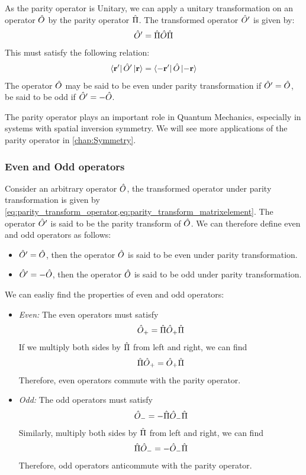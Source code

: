 As the parity operator is Unitary, we can apply a unitary transformation on an operator $\hat{O}$ by the parity operator $\hat{\Pi}$. The transformed operator $\hat{O}'$ is given by:
\begin{align}
    \hat{O}' = \hat{\Pi} \hat{O} \hat{\Pi} \label{eq:parity_transform_operator}
\end{align}
This must satisfy the following relation:
\begin{align}
    \bra{\mathbf{r'}} \hat{O}' \ket{\mathbf{r}} = \bra{-\mathbf{r'}} \hat{O} \ket{-\mathbf{r}} \label{eq:parity_transform_matrixelement}
\end{align}
The operator $\hat{O}$ may be said to be even under parity transformation if $\hat{O}' = \hat{O}$, be said to be odd if $\hat{O}'=-\hat{O}$.

The parity operator plays an important role in Quantum Mechanics, especially in systems with spatial inversion symmetry. We will see more applications of the parity operator in \cref{chap:Symmetry}.

\subsubsection{Even and Odd operators}
Consider an arbitrary operator $\hat{O}$, the transformed operator under parity transformation is given by \cref{eq:parity_transform_operator,eq:parity_transform_matrixelement}. The operator $\hat{O}'$ is said to be the parity transform of $\hat{O}$. We can therefore define even and odd operators as follows:
\begin{itemize}
    \item $\hat{O}' = \hat{O}$, then the operator $\hat{O}$ is said to be even under parity transformation.
    \item $\hat{O}' = -\hat{O}$, then the operator $\hat{O}$ is said to be odd under parity transformation.
\end{itemize}
We can easliy find the properties of even and odd operators:
\begin{itemize}
    \item \emph{Even:} The even operators must satisfy 
    \begin{align}
        \hat{O}_+ = \hat{\Pi} \hat{O}_+ \hat{\Pi} 
    \end{align}
    If we multiply both sides by $\hat{\Pi}$ from left and right, we can find
    \begin{align}
        \hat{\Pi} \hat{O}_+ = \hat{O}_+ \hat{\Pi}
    \end{align}
    Therefore, even operators commute with the parity operator.
    \item \emph{Odd:} The odd operators must satisfy
    \begin{align}
        \hat{O}_- = - \hat{\Pi} \hat{O}_- \hat{\Pi}
    \end{align}
    Similarly, multiply both sides by $\hat{\Pi}$ from left and right, we can find
    \begin{align}
        \hat{\Pi} \hat{O}_- = - \hat{O}_- \hat{\Pi}
    \end{align}
    Therefore, odd operators anticommute with the parity operator.
\end{itemize}
